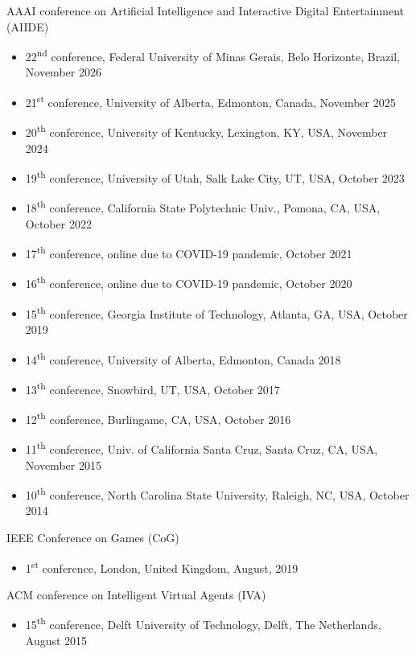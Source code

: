 \documentclass{cv}
\begin{document}
\noindent AAAI conference on Artificial Intelligence and Interactive Digital Entertainment (AIIDE)
\begin{itemize}
	\item 22\textsuperscript{nd} conference, Federal University of Minas Gerais, Belo Horizonte, Brazil, November 2026
	\item 21\textsuperscript{st} conference, University of Alberta, Edmonton, Canada, November 2025
	\item 20\textsuperscript{th} conference, University of Kentucky, Lexington, KY, USA, November 2024
	\item 19\textsuperscript{th} conference, University of Utah, Salk Lake City, UT, USA, October 2023
	\item 18\textsuperscript{th} conference, California State Polytechnic Univ., Pomona, CA, USA, October 2022
	\item 17\textsuperscript{th} conference, online due to COVID-19 pandemic, October 2021
	\item 16\textsuperscript{th} conference, online due to COVID-19 pandemic, October 2020
	\item 15\textsuperscript{th} conference, Georgia Institute of Technology, Atlanta, GA, USA, October 2019
	\item 14\textsuperscript{th} conference, University of Alberta, Edmonton, Canada 2018
	\item 13\textsuperscript{th} conference, Snowbird, UT, USA, October 2017
	\item 12\textsuperscript{th} conference, Burlingame, CA, USA, October 2016
	\item 11\textsuperscript{th} conference, Univ. of California Santa Cruz, Santa Cruz, CA, USA, November 2015
	\item 10\textsuperscript{th} conference, North Carolina State University, Raleigh, NC, USA, October 2014
\end{itemize}

\noindent IEEE Conference on Games (CoG)
\begin{itemize}
	\item 1\textsuperscript{st} conference, London, United Kingdom, August, 2019
\end{itemize}

\noindent ACM conference on Intelligent Virtual Agents (IVA)
\begin{itemize}
	\item 15\textsuperscript{th} conference, Delft University of Technology, Delft, The Netherlands, August 2015
\end{itemize}
\end{document}
